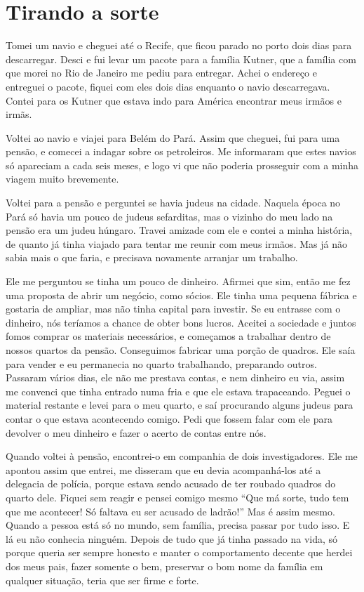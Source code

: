 \chapter{Tirando a sorte}

Tomei um navio e cheguei até o Recife, que ficou parado no porto
dois dias para descarregar. Desci e fui levar um pacote para a família
Kutner, que a família
com que morei no Rio de Janeiro me pediu para entregar. 
Achei o endereço e entreguei o pacote, fiquei com eles dois
dias enquanto o navio descarregava. Contei para os Kutner que estava
indo para América encontrar meus irmãos e irmãs.

Voltei ao navio e viajei para Belém do Pará. Assim que cheguei, fui para
uma pensão, e comecei a indagar sobre os petroleiros. Me
informaram que estes navios só apareciam a cada seis meses, e logo vi que
não poderia prosseguir com a minha viagem muito brevemente.

Voltei para a pensão e perguntei se havia judeus na cidade. Naquela
época no Pará só havia um pouco de judeus sefarditas, mas o vizinho do meu lado na pensão 
era um judeu húngaro. Travei amizade com ele e
contei a minha história, de quanto já tinha viajado para tentar me
reunir com meus irmãos. Mas já não sabia mais o que faria, e precisava novamente
arranjar um trabalho.

Ele me perguntou se tinha um pouco de dinheiro. Afirmei que sim,
então me fez uma proposta de abrir um negócio, como sócios. Ele tinha uma
pequena fábrica e gostaria de ampliar, mas não tinha capital para
investir. Se eu entrasse com o dinheiro, nós teríamos a chance de obter
bons lucros. Aceitei a sociedade e juntos fomos comprar os materiais
necessários, e começamos a trabalhar dentro de nossos quartos da pensão.
Conseguimos fabricar uma porção de quadros. Ele saía para vender e eu
permanecia no quarto trabalhando, preparando outros. Passaram vários
dias, ele não me prestava contas, e nem dinheiro eu via, assim me
convenci que tinha entrado numa fria e que ele estava trapaceando. Peguei
o material restante e levei para o meu quarto, e saí procurando alguns
judeus para contar o que estava acontecendo comigo. Pedi que
fossem falar com ele para devolver o meu dinheiro e fazer o acerto de
contas entre nós.

Quando voltei à pensão, encontrei-o em companhia de dois investigadores. 
Ele me apontou assim que entrei, me disseram que eu devia
acompanhá-los até a delegacia de polícia, porque estava sendo acusado de
ter roubado quadros do quarto dele. Fiquei sem reagir e pensei comigo
mesmo ``Que má sorte, tudo tem que me acontecer! Só faltava eu ser
acusado de ladrão!'' Mas é assim mesmo. Quando a pessoa está só no
mundo, sem família, precisa passar por tudo isso. E lá eu não conhecia
ninguém. Depois de tudo que já tinha passado na vida, só porque queria
ser sempre honesto e manter o comportamento decente que herdei dos meus
pais, fazer somente o bem, preservar o bom nome da família em
qualquer situação, teria que ser firme e forte.

